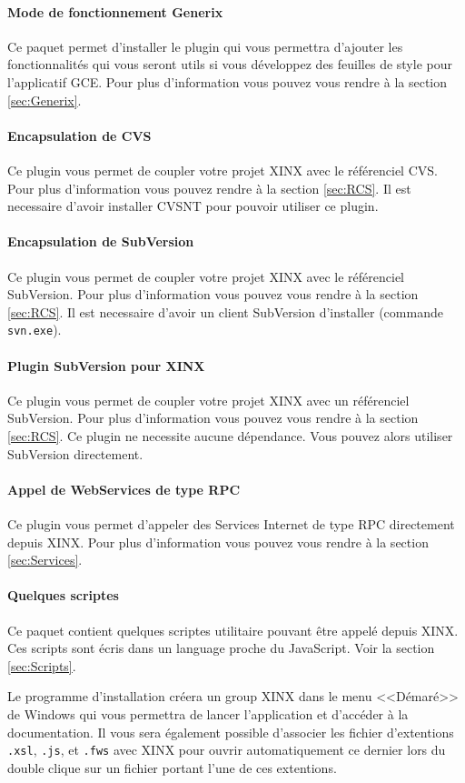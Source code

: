 \documentclass[a4paper,10pt,twoside]{book}
\begin{document}
\paragraph{Mode de fonctionnement Generix} Ce paquet permet d'installer le plugin qui vous permettra d'ajouter les fonctionnalités qui vous seront utils si vous développez des feuilles de style pour l'applicatif GCE. Pour plus d'information vous pouvez vous rendre à la section \ref{sec:Generix}.
\paragraph{Encapsulation de CVS} Ce plugin vous permet de coupler votre projet XINX avec le référenciel CVS. Pour plus d'information vous pouvez rendre à la section \ref{sec:RCS}. Il est necessaire d'avoir installer CVSNT pour pouvoir utiliser ce plugin.
\paragraph{Encapsulation de SubVersion} Ce plugin vous permet de coupler votre projet XINX avec le référenciel SubVersion. Pour plus d'information vous pouvez vous rendre à la section \ref{sec:RCS}. Il est necessaire d'avoir un client SubVersion d'installer (commande \verb+svn.exe+).
\paragraph{Plugin SubVersion pour XINX} Ce plugin vous permet de coupler votre projet XINX avec un référenciel SubVersion. Pour plus d'information vous pouvez vous rendre à la section \ref{sec:RCS}. Ce plugin ne necessite aucune dépendance. Vous pouvez alors utiliser SubVersion directement.
\paragraph{Appel de WebServices de type RPC} Ce plugin vous permet d'appeler des Services Internet de type RPC directement depuis XINX. Pour plus d'information vous pouvez vous rendre à la section \ref{sec:Services}.
\paragraph{Quelques scriptes} Ce paquet contient quelques scriptes utilitaire pouvant être appelé depuis XINX. Ces scripts sont écris dans un language proche du JavaScript. Voir la section \ref{sec:Scripts}.

Le programme d'installation créera un group XINX dans le menu <<Démaré>> de Windows qui vous permettra de lancer l'application et d'accéder à la documentation. Il vous sera également possible d'associer les fichier d'extentions \verb+.xsl+, \verb+.js+, et \verb+.fws+ avec XINX pour ouvrir automatiquement ce dernier lors du double clique sur un fichier portant l'une de ces extentions.
\end{document}
